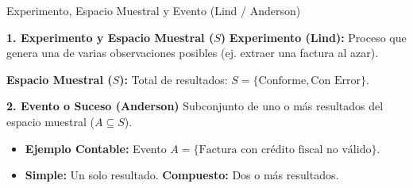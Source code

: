 \documentclass[10pt]{beamer}
\begin{document}
\begin{frame}{Experimento, Espacio Muestral y Evento (Lind / Anderson)}
  \begin{block}{\textbf{1. Experimento y Espacio Muestral ($S$)}}
    \textbf{Experimento (Lind):} Proceso que genera una de varias observaciones posibles (ej. extraer una factura al azar).
    
    \textbf{Espacio Muestral ($S$):} Total de resultados: $S = \{\text{Conforme}, \text{Con Error}\}$.
  \end{block}

  \begin{block}{\textbf{2. Evento o Suceso (Anderson)}}
    Subconjunto de uno o más resultados del espacio muestral ($A \subseteq S$).
    \begin{itemize}
      \item \textbf{Ejemplo Contable:} Evento $A = \{\text{Factura con crédito fiscal no válido}\}$.
      \item \textbf{Simple:} Un solo resultado. \quad \textbf{Compuesto:} Dos o más resultados.
    \end{itemize}
  \end{block}
\end{frame}
\end{document}
